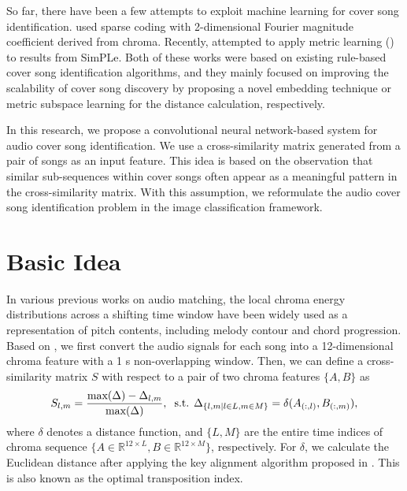 \documentclass{article}
\begin{document}
So far, there have been a few attempts to exploit machine learning for cover song identification. \citet{humphrey2013data} used sparse coding with 2-dimensional Fourier magnitude coefficient derived from chroma. Recently, \citet{heocover} attempted to apply metric learning (\citet{davis2007information}) to results from SimPLe. Both of these works were based on existing rule-based cover song identification algorithms, and they mainly focused on improving the scalability of cover song discovery by proposing a novel embedding technique or metric subspace learning for the distance calculation, respectively. 

In this research, we propose a convolutional neural network-based system for audio cover song identification. We use a cross-similarity matrix generated from a pair of songs as an input feature. This idea is based on the observation that similar sub-sequences within cover songs often appear as a meaningful pattern in the cross-similarity matrix. With this assumption, we reformulate the audio cover song identification problem in the image classification framework.

\section{Basic Idea}
\label{sec:idea}
In various previous works on audio matching, the local chroma energy distributions across a shifting time window have been widely used as a representation of pitch contents, including melody contour and chord progression. Based on \citet{hu2003polyphonic}, we first convert the audio signals for each song into a 12-dimensional chroma feature with a 1 s non-overlapping window. Then, we can define a cross-similarity matrix $S$ with respect to a pair of two chroma features $\{A,B\}$ as  
\begin{equation}
S_{l,m}=\frac{\text{max}(\Delta)-\Delta_{l,m}}{\text{max}(\Delta)},\hspace*{.2cm} \text{s.t.}\hspace*{.15cm} \Delta_{\{l,m|l\in L, m\in M\}}= \delta(A_{(:,l)},B_{(:,m)}), 
\label{eq:ssm_gen}
\end{equation}
where $\delta$ denotes a distance function, and $\{L,M\}$ are the entire time indices of chroma sequence $\{A\in \mathbb{R}^{12  \times L},B\in \mathbb{R}^{12  \times M}\}$, respectively. For $\delta$, we calculate the Euclidean distance after applying the key alignment algorithm proposed in \citet{serra2008transposing}. This is also known as the optimal transposition index.
\end{document}
